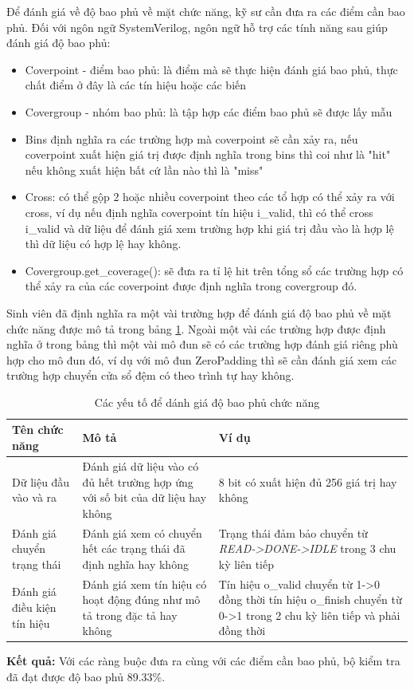 Để đánh giá về độ bao phủ về mặt chức năng, kỹ sư cần đưa ra các điểm cần bao phủ. Đối với ngôn ngữ SystemVerilog, ngôn ngữ hỗ trợ các tính năng sau giúp đánh giá độ bao phủ:
\begin{itemize}
	\item Coverpoint - điểm bao phủ: là điểm mà sẽ thực hiện đánh giá bao phủ, thực chất điểm ở đây là các tín hiệu hoặc các biến
	\item Covergroup - nhóm bao phủ: là tập hợp các điểm bao phủ sẽ được lấy mẫu
	\item Bins định nghĩa ra các trường hợp mà coverpoint sẽ cần xảy ra, nếu coverpoint xuất hiện giá trị được định nghĩa trong bins thì coi như là "hit" nếu không xuất hiện bất cứ lần nào thì là "miss"
	\item Cross: có thể gộp 2 hoặc nhiều coverpoint theo các tổ hợp có thể xảy ra với cross, ví dụ nếu định nghĩa coverpoint tín hiệu i\_valid, thì có thể cross i\_valid và dữ liệu để đánh giá xem trường hợp khi giá trị đầu vào là hợp lệ thì dữ liệu có hợp lệ hay không.
	\item Covergroup.get\_coverage(): sẽ đưa ra tỉ lệ hit trên tổng sổ các trường hợp có thể xảy ra của các coverpoint được định nghĩa trong covergroup đó.
\end{itemize}
Sinh viên đã định nghĩa ra một vài trường hợp để đánh giá độ bao phủ về mặt chức năng được mô tả trong bảng \ref{tab:myFC}. Ngoài một vài các trường hợp được định nghĩa ở trong bảng thì một vài mô đun sẽ có các trường hợp đánh giá riêng phù hợp cho mô đun đó, ví dụ với mô đun ZeroPadding thì sẽ cần đánh giá xem các trường hợp chuyển cửa sổ đệm có theo trình tự hay không.

\begin{table}[H]
	\centering
	\renewcommand{\arraystretch}{1.3}
	\begin{tabular}{|p{4cm} p{4cm} p{6cm}|}
		\hline
		\rowcolor{gray!30}
		\textbf{Tên chức năng} & \textbf{Mô tả}  & Ví dụ  \\
		\hline
		Dữ liệu đầu vào và ra & Đánh giá dữ liệu vào có đủ hết trường hợp ứng với số bit của dữ liệu hay không & 8 bit có xuất hiện đủ 256 giá trị hay không
		\\ \hline
		Đánh giá chuyển trạng thái & Đánh giá xem có chuyển hết các trạng thái đã định nghĩa hay không & Trạng thái đảm bảo chuyển từ \textit{READ->DONE->IDLE} trong 3 chu kỳ liên tiếp
	
		\\ \hline
		Đánh giá điều kiện tín hiệu & Đánh giá xem tín hiệu có hoạt động đúng như mô tả trong đặc tả hay không & Tín hiệu o\_valid chuyển từ 1->0 đồng thời tín hiệu o\_finish chuyển từ 0->1 trong 2 chu kỳ liên tiếp và phải đồng thời
		\\ \hline
	\end{tabular}
	\caption{Các yếu tố để dánh giá độ bao phủ chức năng}
	\label{tab:myFC}
\end{table}

\textbf{Kết quả: } Với các ràng buộc đưa ra cùng với các điểm cần bao phủ, bộ kiểm tra đã đạt được độ bao phủ 89.33\%. 



